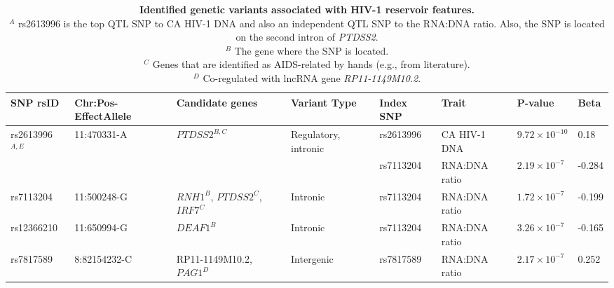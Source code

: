 \documentclass{book}
\begin{document}
\begin{refsection}
\begin{landscape}
  \begin{table}
    \small
    \renewcommand{\arraystretch}{1.25}
    \begin{tabular}{p{1.6cm}p{2cm}p{2.5cm}p{1.9cm}p{1.5cm}p{2.3cm}p{1.6cm}p{1cm}}
      \hline
      SNP rsID                         & Chr:Pos-EffectAllele           & Candidate genes                 & Variant Type                                            & Index SNP & Trait         & P-value                & Beta \\
      \hline
      \multirow{2}{*}{rs2613996$^{A,E}$} & \multirow{2}{*}{11:470331-A} & \multirow{2}{*}{$PTDSS2^{B,C}$} & \multirow{2}{2.5cm}{Regulatory, intronic} & rs2613996 & CA HIV-1 DNA  & $9.72 \times 10^{-10}$ & 0.18 \\
      \cline{5-8}
                                       &                                &                                 &                                           & rs7113204 & RNA:DNA ratio & $2.19 \times 10^{-7}$  & -0.284 \\
      \hline
      rs7113204                        & 11:500248-G                    & $RNH1^B$, $PTDSS2^C$, $IRF7^C$  & Intronic                                  & rs7113204 & RNA:DNA ratio & $1.72 \times 10^{-7}$  & -0.199 \\
      \hline
      rs12366210                       & 11:650994-G                    & $DEAF1^B$                       & Intronic                                  & rs7113204 & RNA:DNA ratio & $3.26 \times 10^{-7}$  & -0.165 \\
      \hline
      rs7817589                        & 8:82154232-C                   & RP11-1149M10.2, $PAG1^D$        & Intergenic                                & rs7817589 & RNA:DNA ratio & $2.17 \times 10^{-7}$  & 0.252 \\
      \hline
    \end{tabular}
    \caption{
      \label{tab:cht4tab2} \textbf{Identified genetic variants associated with HIV-1 reservoir features.} \\
      $^A$ rs2613996 is the top QTL SNP to CA HIV-1 DNA and also an independent QTL SNP to the RNA:DNA ratio. Also, the SNP is located on the second intron of \textit{PTDSS2}. \\
      $^B$ The gene where the SNP is located. \\
      $^C$ Genes that are identified as AIDS-related by hands (e.g., from literature). \\
      $^D$ Co-regulated with lncRNA gene \textit{RP11-1149M10.2}.
    }
  \end{table}
\end{landscape}


\end{refsection}
\end{document}
